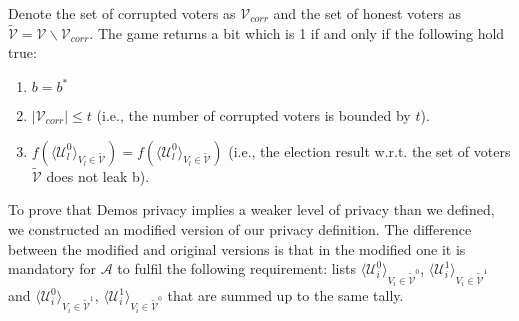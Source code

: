 \begin{definition}
\begin{enumerate}
\end{enumerate}
Denote the set of corrupted voters as $\mathcal{V}_{corr}$ and the set of honest voters as $\tilde{\mathcal{V}}= \mathcal{V} \backslash \mathcal{V}_{corr}$. The game returns a bit which is 1 if and only if the following hold true:
\begin{enumerate}
 \item $b = b^*$
 \item $|\mathcal{V}_{corr}| \leq t$ (i.e., the number of corrupted voters is bounded by $t$).
 \item $f(\langle \mathcal{U}^0_l \rangle _{V_l \in \tilde{\mathcal{V}}} ) = f(\langle \mathcal{U}^0_l \rangle _{V_l \in \tilde{\mathcal{V}}})$ (i.e., the election result w.r.t. the set of voters  $\tilde{\mathcal{V}}$ does not leak b).
\end{enumerate} 
\end{definition}
To prove that Demos privacy implies a weaker level of privacy than we defined, we constructed an modified version of our privacy definition. The difference between the modified and original versions is that in the modified one it is mandatory for  $\mathcal{A}$ to fulfil the following requirement: lists $\langle \mathcal{U}^0_i \rangle _{V_i \in \tilde{\mathcal{V}}^0}$, $\langle \mathcal{U}^1_i \rangle _{V_i \in \tilde{\mathcal{V}}^1}$ and  $\langle \mathcal{U}^0_i \rangle _{V_i \in \tilde{\mathcal{V}}^1} $, $\langle \mathcal{U}^1_i \rangle _{V_i \in \tilde{\mathcal{V}}^0}$ that are summed up to the same tally.\\
 
